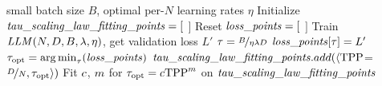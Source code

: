 \renewcommand{\algorithmiccomment}[1]{$\triangleright$ #1}
\begin{algorithm}[t]
  \caption{Generating the optimal $\tepoch$ power law}
  \label{alg:tepoch_fitting}
  \begin{algorithmic}
    \small
     small batch size $B$, optimal per-$N$ learning rates $\eta$ 
    \STATE Initialize $\mathit{tau\_scaling\_law\_fitting\_points} = [$ $]$
        \STATE Reset $\mathit{loss\_points} = [$ $]$
          \STATE Train $\mathit{LLM}(N,D,B,\lambda,\eta)$, get validation loss $L'$
          \STATE $\tau = \nicefrac{B}{\eta \lambda D}$
          \STATE $\mathit{loss\_points}[\tau] = L'$
        \ENDFOR %
        \STATE ${\tau}_{\text{opt}} = \operatorname*{arg\,min}_{\tau}(\mathit{loss\_points})$
        \STATE $\mathit{tau\_scaling\_law\_fitting\_points}.add( \langle \mathrm{TPP}$=$\nicefrac{D}{N}, {\tau}_{\text{opt}} \rangle )$
      \ENDFOR %
    \ENDFOR %
    \STATE Fit $c$, $m$ for ${\tau}_{\text{opt}} = {c} \mathrm{TPP}^{m}$ on $\mathit{tau\_scaling\_law\_fitting\_points}$
  \end{algorithmic}
\end{algorithm}
